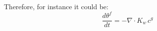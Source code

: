 Therefore, for instance it could be:
\begin{equation}
\frac{d \theta^f}{dt} = - {\nabla}\cdot  K_w\, c^g
\end{equation}